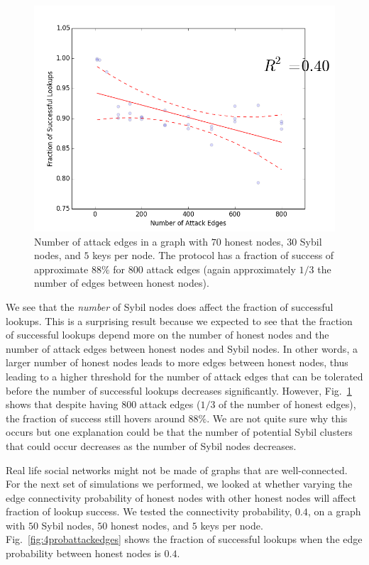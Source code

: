 \documentclass[letter]{article}
\begin{document}
\begin{figure}[!h]
\centering
\includegraphics[width=0.9\columnwidth]{sybilattackedges30}
\caption{Number of attack edges in a graph with $70$ honest nodes, $30$ Sybil nodes, and $5$ keys per node. The protocol has a fraction of success of approximate $88\%$ for $800$ attack edges (again approximately $1/3$ the number of edges between honest nodes).}
\label{fig:sybilattackedges30}
\end{figure}

We see that the \emph{number} of Sybil nodes does affect the fraction of successful lookups. This is a surprising result because we expected to see that the fraction of successful lookups depend more on the number of honest nodes and the number of attack edges between honest nodes and Sybil nodes. In other words, a larger number of honest nodes leads to more edges between honest nodes, thus leading to a higher threshold for the number of attack edges that can be tolerated before the number of successful lookups decreases significantly. However, Fig.~\ref{fig:sybilattackedges30} shows that despite having $800$ attack edges ($1/3$ of the number of honest edges), the fraction of success still hovers around $88\%$. We are not quite sure why this occurs but one explanation could be that the number of potential Sybil clusters that could occur decreases as the number of Sybil nodes decreases.

Real life social networks might not be made of graphs that are well-connected. For the next set of simulations we performed, we looked at whether varying the edge connectivity probability of honest nodes with other honest nodes will affect fraction of lookup success. We tested the connectivity probability, $0.4$, on a graph with $50$ Sybil nodes, $50$ honest nodes, and $5$ keys per node. Fig.~\ref{fig:4probattackedges} shows the fraction of successful lookups when the edge probability between honest nodes is $0.4$.
\end{document}
